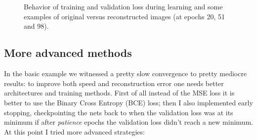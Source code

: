 \documentclass[a4paper, 11pt]{article}
\begin{document}
    \begin{figure}
      \centering
       \,
       \\
       \,
      \caption{Behavior of training and validation loss during learning and some examples of original versus reconstructed images (at epochs 20, 51 and 98).}
      \label{fig:basic}
    \end{figure}

\subsection{More advanced methods}
  In the basic example we witnessed a pretty slow convergence to pretty mediocre results: to improve both speed and reconstruction error one needs better architectures and training methods. First of all instead of the MSE loss it is better to use the Binary Cross Entropy (BCE) loss; then I also implemented early stopping, checkpointing the nets back to when the validation loss was at its minimum if after \emph{patience} epochs the validation loss didn't reach a new minimum. At this point I tried more advanced strategies:
\end{document}
